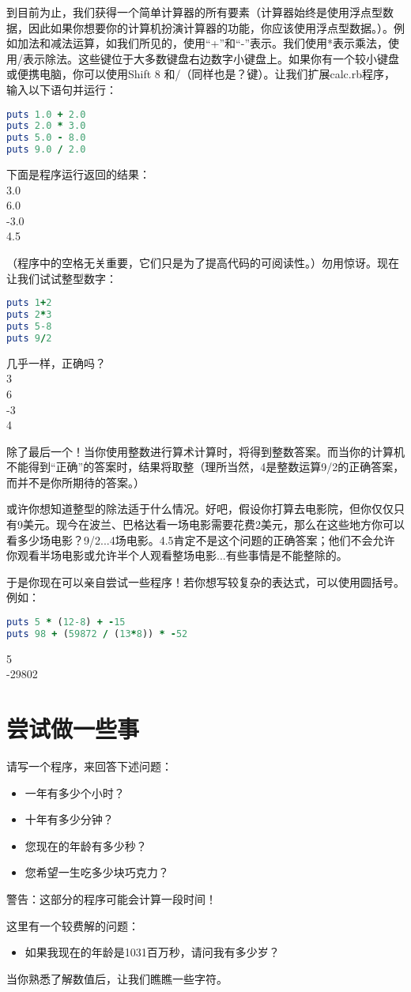 到目前为止，我们获得一个简单计算器的所有要素（计算器始终是使用浮点型数据，因此如果你想要你的计算机扮演计算器的功能，你应该使用浮点型数据。）。例如加法和减法运算，如我们所见的，使用“+”和“-”表示。我们使用*表示乘法，使用/表示除法。这些键位于大多数键盘右边数字小键盘上。如果你有一个较小键盘或便携电脑，你可以使用Shift 8 和/（同样也是？键）。让我们扩展calc.rb程序，输入以下语句并运行：
\begin{lstlisting}[language=ruby]
puts 1.0 + 2.0
puts 2.0 * 3.0
puts 5.0 - 8.0
puts 9.0 / 2.0
\end{lstlisting}

下面是程序运行返回的结果：\\
3.0\\
6.0\\
-3.0\\
4.5

（程序中的空格无关重要，它们只是为了提高代码的可阅读性。）勿用惊讶。现在让我们试试整型数字：
\begin{lstlisting}[language=ruby]
puts 1+2
puts 2*3
puts 5-8
puts 9/2
\end{lstlisting}

几乎一样，正确吗？\\
3\\
6\\
-3\\
4

除了最后一个！当你使用整数进行算术计算时，将得到整数答案。而当你的计算机不能得到“正确”的答案时，结果将取整（理所当然，4是整数运算9/2的正确答案，而并不是你所期待的答案。）

或许你想知道整型的除法适于什么情况。好吧，假设你打算去电影院，但你仅仅只有9美元。现今在波兰、巴格达看一场电影需要花费2美元，那么在这些地方你可以看多少场电影？9/2...4场电影。4.5肯定不是这个问题的正确答案；他们不会允许你观看半场电影或允许半个人观看整场电影...有些事情是不能整除的。

于是你现在可以亲自尝试一些程序！若你想写较复杂的表达式，可以使用圆括号。例如：
\begin{lstlisting}[language=ruby]
puts 5 * (12-8) + -15
puts 98 + (59872 / (13*8)) * -52
\end{lstlisting}

5\\
-29802

\section{尝试做一些事}

请写一个程序，来回答下述问题：
\begin{itemize}
\item 一年有多少个小时？
\item 十年有多少分钟？
\item 您现在的年龄有多少秒？
\item 您希望一生吃多少块巧克力？
\end{itemize}

警告：这部分的程序可能会计算一段时间！

这里有一个较费解的问题：
\begin{itemize}
\item 如果我现在的年龄是1031百万秒，请问我有多少岁？
\end{itemize}

当你熟悉了解数值后，让我们瞧瞧一些字符。
